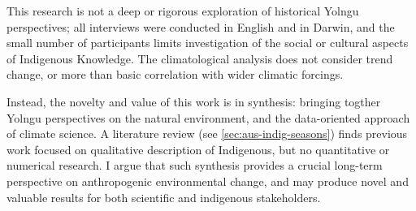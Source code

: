 This research is not a deep or rigorous exploration of historical Yolngu
perspectives; all interviews were conducted in English and in Darwin, and
the small number of participants limits investigation of the social or
cultural aspects of Indigenous Knowledge.  The climatological analysis
does not consider trend change, or more than basic correlation with
wider climatic forcings.

Instead, the novelty and value of this work is in synthesis: bringing
togther Yolngu perspectives on the natural environment, and the
data-oriented approach of climate science.  A literature review (see
\cref{sec:aus-indig-seasons}) finds previous work focused on qualitative
description of Indigenous, but no quantitative or numerical research.
I argue that such synthesis provides a crucial long-term perspective on
anthropogenic environmental change, and may produce novel and valuable
results for both scientific and indigenous stakeholders.

